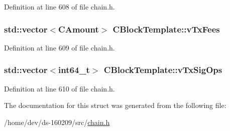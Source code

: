 Definition at line 608 of file chain.\+h.

\hypertarget{struct_c_block_template_a66287bde795cc8e8c8cb59c4e2302d49}{}
\subsubsection[{v\+Tx\+Fees}]{\setlength{\rightskip}{0pt plus 5cm}std\+::vector$<${\bf C\+Amount}$>$ C\+Block\+Template\+::v\+Tx\+Fees}\label{struct_c_block_template_a66287bde795cc8e8c8cb59c4e2302d49}


Definition at line 609 of file chain.\+h.

\hypertarget{struct_c_block_template_a13326eb92a7d2fc073d9f5660dfcdde5}{}
\subsubsection[{v\+Tx\+Sig\+Ops}]{\setlength{\rightskip}{0pt plus 5cm}std\+::vector$<${\bf int64\+\_\+t}$>$ C\+Block\+Template\+::v\+Tx\+Sig\+Ops}\label{struct_c_block_template_a13326eb92a7d2fc073d9f5660dfcdde5}


Definition at line 610 of file chain.\+h.



The documentation for this struct was generated from the following file\+:\begin{DoxyCompactItemize}
\item 
/home/dev/ds-\/160209/src/\hyperlink{chain_8h}{chain.\+h}\end{DoxyCompactItemize}
